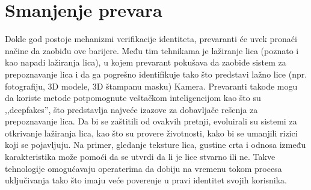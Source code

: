 \documentclass[a4paper]{article}
\begin{document}
\section{Smanjenje prevara}
\label{sec:smanjenje prevara}
Dokle god postoje mehanizmi verifikacije identiteta, prevaranti će uvek pronaći načine da zaobiđu ove barijere. Među tim tehnikama je lažiranje lica (poznato i kao napadi lažiranja lica), u kojem prevarant pokušava da zaobiđe sistem za prepoznavanje lica i da ga pogrešno identifikuje tako što predstavi lažno lice (npr. fotografiju, 3D modele, 3D štampanu masku) Kamera. Prevaranti takođe mogu da koriste metode potpomognute veštačkom inteligencijom kao što su ,,deepfakes”, što predstavlja najveće izazove za dobavljače rešenja za prepoznavanje lica.
Da bi se zaštitili od ovakvih pretnji, evoluirali su sistemi za otkrivanje lažiranja lica, kao što su provere životnosti, kako bi se umanjili rizici koji se pojavljuju. Na primer, gledanje teksture lica, gustine crta i odnosa između karakteristika može pomoći da se utvrdi da li je lice stvarno ili ne. Takve tehnologije omogućavaju operaterima da dobiju na vremenu tokom procesa uključivanja tako što imaju veće poverenje u pravi identitet svojih korisnika.
\newpage
\end{document}
